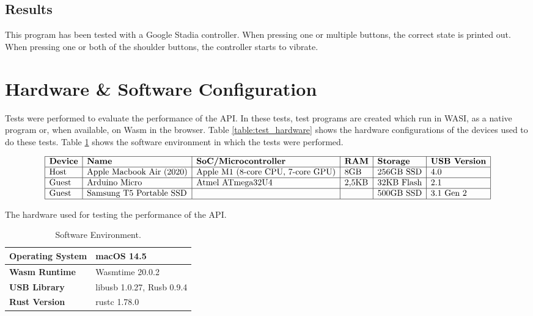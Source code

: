 \subsection{Results}
This program has been tested with a Google Stadia controller. When pressing one or multiple buttons, the correct state is printed out. When pressing one or both of the shoulder buttons, the controller starts to vibrate.



\section{Hardware \& Software Configuration}

Tests were performed to evaluate the performance of the API. In these tests, test programs are created which run in WASI, as a native program or, when available, on Wasm in the browser. Table \ref{table:test_hardware} shows the hardware configurations of the devices used to do these tests. Table \ref{table:software_environment} shows the software environment in which the tests were performed.

\begin{table}[H]
\[
\begin{array}{|l|l|l|l|l|l|}
\hline
\textbf{Device} & \textbf{Name} & \textbf{SoC/Microcontroller} & \textbf{RAM} & \textbf{Storage} & \textbf{USB Version} \\
\hline
\text{Host} & \text{Apple Macbook Air (2020)} & \text{Apple M1 (8-core CPU, 7-core GPU)} & \text{8GB} & \text{256GB SSD} & \text{4.0} \\

\hline
\text{Guest} & \text{Arduino Micro} & \text{Atmel ATmega32U4} & \text{2,5KB} & \text{32KB Flash} & \text{2.1} \\

\hline
\text{Guest} & \text{Samsung T5 Portable SSD} & \text{} & \text{} & \text{500GB SSD} & \text{3.1 Gen 2} \\
\hline
\end{array}
\]
\caption{The hardware used for testing the performance of the API.}
\label{table:test_hardware}
\end{table}

\begin{table}[h]
\centering
\begin{tabular}{|l|l|}
\hline
\textbf{Operating System} & macOS 14.5 \\ \hline
\textbf{Wasm Runtime} & Wasmtime 20.0.2 \\ \hline
\textbf{USB Library} & libusb 1.0.27, Rusb 0.9.4 \\ \hline
\textbf{Rust Version} & rustc 1.78.0 \\ \hline
\end{tabular}
\caption{Software Environment.}
\label{table:software_environment}
\end{table}


